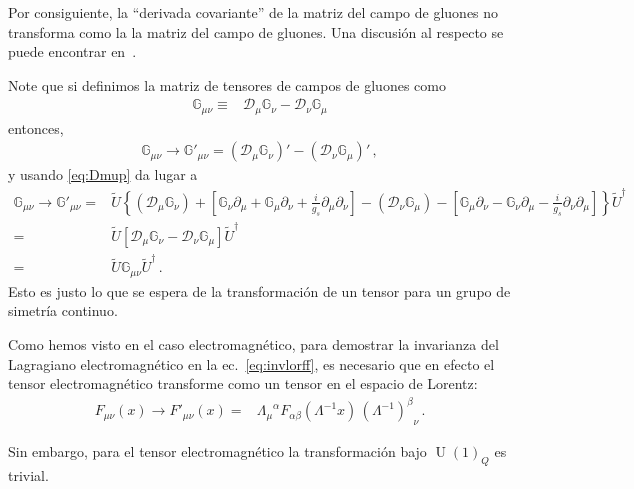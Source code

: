Por consiguiente, la ``derivada covariante'' de la matriz del campo de gluones no transforma como la la matriz del campo de gluones. Una discusión al respecto se puede encontrar en~\cite{2015arXiv151203827R}.

\begin{frame}
Note que si definimos la matriz de tensores de campos de gluones como
\begin{align}
  \label{eq:gmunu}
   \mathbb{G}_{\mu\nu}\equiv & \mathcal{D}_{\mu} \mathbb{G}_{\nu}-\mathcal{D}_{\nu} \mathbb{G}_{\mu} 
\end{align}
entonces,
\begin{align}
   \mathbb{G}_{\mu\nu}\to  \mathbb{G}'_{\mu\nu}=\left( \mathcal{D}_{\mu} \mathbb{G}_{\nu} \right)'-\left( \mathcal{D}_{\nu} \mathbb{G}_{\mu}  \right)'\,,
\end{align}
y usando \eqref{eq:Dmup} da lugar a
\begin{align}
\label{eq:ugum}
    \mathbb{G}_{\mu\nu}\to  \mathbb{G}'_{\mu\nu}=&  \widetilde{U} \left\{ \left( \mathcal{D}_{\mu}\mathbb{G}_\nu   \right)
    +  \left[ \mathbb{G}_{\nu} \partial_{\mu}+\mathbb{G}_{\mu}\partial_{\nu}+\frac{i}{g_s} \partial_{\mu}\partial_{\nu} \right]
  -   \left( \mathcal{D}_{\nu}\mathbb{G}_\mu   \right)
    - \left[ \mathbb{G}_{\mu} \partial_{\nu}-\mathbb{G}_{\nu}\partial_{\mu}-\frac{i}{g_s} \partial_{\nu}\partial_{\mu} \right]  \right\} \widetilde{U}^{\dagger} \nonumber\\
=&  \widetilde{U} \left[  \mathcal{D}_{\mu}\mathbb{G}_\nu 
    -   \mathcal{D}_{\nu}\mathbb{G}_\mu
  \right] \widetilde{U}^{\dagger} \nonumber\\
=& \widetilde{U} \mathbb{G}_{\mu\nu} \widetilde{U}^{\dagger}\,.
\end{align}
Esto es justo lo que se espera de la transformación de un tensor para un grupo de simetría continuo.
\end{frame}

Como hemos visto en el caso electromagnético, para demostrar la invarianza del Lagragiano electromagnético en la ec.~\eqref{eq:invlorff}, es necesario que en efecto el tensor electromagnético transforme como un tensor en el espacio de Lorentz:
\begin{align}
  F_{\mu\nu}(x) \to F'_{\mu\nu}(x)  =& { \Lambda_{\mu}}^{\alpha}F_{\alpha\beta}\left( \Lambda^{-1}x \right)\,
                   {\left( \Lambda^{-1} \right)^{\beta}}_{\nu} \,.
\end{align}


Sin embargo, para el tensor electromagnético la transformación bajo $\operatorname{U}(1)_Q$ es trivial.

